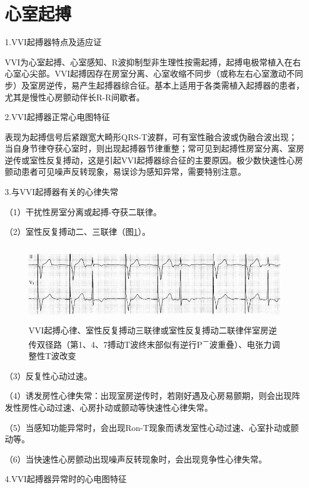 \protect\hypertarget{text00045.htmlux5cux23subid492}{}{}

\section{心室起搏}

1.VVI起搏器特点及适应证

VVI为心室起搏、心室感知、R波抑制型非生理性按需起搏，起搏电极常植入在右心室心尖部。VVI起搏因存在房室分离、心室收缩不同步（或称左右心室激动不同步）及室房逆传，易产生起搏器综合征。基本上适用于各类需植入起搏器的患者，尤其是慢性心房颤动伴长R-R间歇者。

2.VVI起搏器正常心电图特征

表现为起搏信号后紧跟宽大畸形QRS-T波群，可有室性融合波或伪融合波出现；当自身节律夺获心室时，则出现起搏器节律重整；常可见到起搏性房室分离、室房逆传或室性反复搏动，这是引起VVI起搏器综合征的主要原因。极少数快速性心房颤动患者可见噪声反转现象，易误诊为感知异常，需要特别注意。

3.与VVI起搏器有关的心律失常

（1）干扰性房室分离或起搏-夺获二联律。

（2）室性反复搏动二、三联律（图\ref{fig38-17}）。

\begin{figure}[!htbp]
 \centering
 \includegraphics[width=5.58333in,height=1.33333in]{./images/Image00620.jpg}
 \captionsetup{justification=centering}
 \caption{VVI起搏心律、室性反复搏动三联律或室性反复搏动二联律伴室房逆传双径路（第1、4、7搏动T波终末部似有逆行P\textsuperscript{－}波重叠）、电张力调整性T波改变}
 \label{fig38-17}
  \end{figure} 


（3）反复性心动过速。

（4）诱发房性心律失常：出现室房逆传时，若刚好遇及心房易颤期，则会出现阵发性房性心动过速、心房扑动或颤动等快速性心律失常。

（5）当感知功能异常时，会出现Ron-T现象而诱发室性心动过速、心室扑动或颤动等。

（6）当快速性心房颤动出现噪声反转现象时，会出现竞争性心律失常。

4.VVI起搏器异常时的心电图特征

